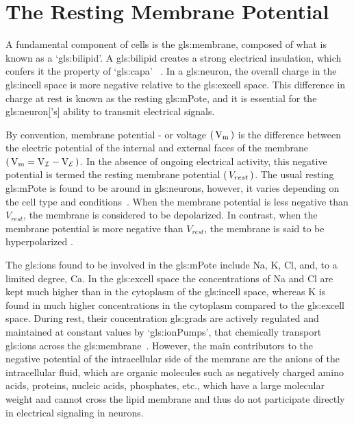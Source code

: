 \documentclass[class={myRUCProject}, crop=false]{standalone}
\begin{document}
\section{The Resting Membrane Potential} 
A fundamental component of cells is the \gls{gls:membrane}, composed of what is known as a `\gls{gls:bilipid}'\footnotemark. A \gls{gls:bilipid} creates a strong electrical insulation, 
which confers it the property of `\gls{gls:capa}'~\cite{}
. 
In a \gls{gls:neuron}, the overall charge in the \gls{gls:incell} space is more negative relative to the \gls{gls:excell} space. This difference in charge at rest is known as the resting \gls{gls:mPote}, and it is essential for the \gls{gls:neuron}['s] ability to transmit electrical signals. 

By convention, membrane potential - or voltage \(\br{\unit{\V\membrane}}\) is the difference between the electric potential of the internal and external faces of the membrane \(\br{\unit{\V\membrane}=\unit{\V\incell}-\unit{\V\excell}}\). In the absence of ongoing electrical activity, this negative potential is termed the resting membrane potential \(\br{V_{rest}}\). The usual resting \gls{gls:mPote} is found to be around  in \glspl{gls:neuron}, however, it varies depending on the cell type and conditions~\cite{}. When the membrane potential is less negative than \(V_{rest}\), the membrane is considered to be depolarized. In contrast, when the membrane potential is more negative than \(V_{rest}\), the membrane is said to be hyperpolarized \cite{Hammond2015ch3}. 

The \glspl{gls:ion} found to be involved in the \gls{gls:mPote} include \gls{Na}, \gls{K}, \gls{Cl}, and, to a limited degree, \gls{Ca}. 
In the \gls{gls:excell} space the concentrations of \gls{Na} and \gls{Cl} are kept much higher than in the cytoplasm of the \gls{gls:incell} space, whereas \gls{K} is found in much higher concentrations in the cytoplasm compared to the \gls{gls:excell} space. During rest, their concentration \glspl{gls:grad} are actively regulated and maintained at constant values by `\glspl{gls:ionPump}', that chemically transport \glspl{gls:ion} across the \gls{gls:membrane}~\cite{}. However, the main contributors to the negative potential of the intracellular side of the memrane are the anions of the intracellular fluid, which are organic molecules such as negatively charged amino acids, proteins, nucleic acids, phosphates, etc., which have a large molecular weight and cannot cross the lipid membrane and thus do not participate directly in electrical signaling in neurons\cite{Hammond2015ch3}. 
\end{document}
